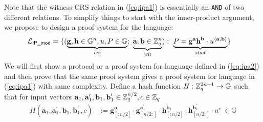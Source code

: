 Note that the witness-CRS relation in (\ref{eq:ipa1}) is essentially an \texttt{AND} of two different relations. To simplify things to start with the inner-product argument,
we propose to design a proof system for the language:
\begin{align}
    \mathcal{L}_{\textsf{IP\_mod}} &= 
        \{ ( \underbrace{\textbf{g}, \textbf{h} \in \mathbb{G}^n, u, P \in \mathbb{G}}_{\textsl{crs}};\
        \underbrace{\textbf{a}, \textbf{b} \in \mathbb{Z}_q^{n}}_{\textsl{wit}}):\
        \underbrace{P = \textbf{g}^{\textbf{a}}\textbf{h}^{\textbf{b}} \cdot u^{\langle \textbf{a}, \textbf{b} \rangle}}_{\textsl{stmt}} \}
        \label{eq:ipa2}
\end{align}
We will first show a protocol or a proof system for language defined in (\ref{eq:ipa2}) and then prove that the same proof system gives a proof system for language in (\ref{eq:ipa1}) with same complexity. 
Define a hash function $H: \mathbb{Z}_{q}^{2n+1} \rightarrow \mathbb{G}$ such that for input vectors $\textbf{a}_1, \textbf{a}_1^{\prime}, \textbf{b}_1, \textbf{b}_1^{\prime} \in \mathbb{Z}_q^{n/2}, c \in \mathbb{Z}_q$
\begin{align}
    H(\textbf{a}_1, \textbf{a}_1^{\prime}, \textbf{b}_1, \textbf{b}_1^{\prime}, c) 
    & :=
    \textbf{g}_{[:n/2]}^{\textbf{a}_1} \cdot 
    \textbf{g}_{[n/2:]}^{\textbf{a}_1^{\prime}}\cdot
    \textbf{h}_{[:n/2]}^{\textbf{b}_1} \cdot 
    \textbf{h}_{[n/2:]}^{\textbf{b}_1^{\prime}}\cdot
    u^c \ \in \mathbb{G}
\end{align}

